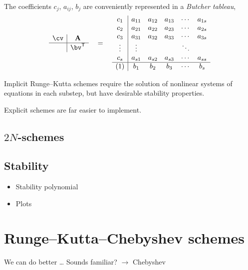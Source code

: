 \documentclass[\mydriver,12pt,twoside,notitlepage]{article}
\newcommand{\Av}      {\mathbf{A}}
\begin{document}
The coefficients $c_j$, $a_{ij}$, $b_j$ are conveniently represented in a
\emph{Butcher tableau},
\begin{equation}
  \begin{array}{c|c}
    \cv & \Av \\
    \hline
        & \bv^{\mathsf T}
  \end{array}
  \quad=\quad
  \begin{array}{c|ccccc}
    c_1    & a_{11} & a_{12} & a_{13} & \cdots & a_{1s} \\
    c_2    & a_{21} & a_{22} & a_{23} & \cdots & a_{2s} \\
    c_3    & a_{31} & a_{32} & a_{33} & \cdots & a_{3s} \\
    \vdots & \vdots &        &        & \ddots &        \\
    c_s    & a_{s1} & a_{s2} & a_{s3} & \cdots & a_{ss} \\
    \hline
    (1)    & b_1    & b_2    & b_3    & \cdots & b_s
  \end{array}
\end{equation}

Implicit Runge--Kutta schemes require the solution of nonlinear systems of
equations in each substep, but have desirable stability properties.

Explicit schemes are far easier to implement.



\subsection{$2N$-schemes}

\subsection{Stability}

\begin{itemize}
  \item Stability polynomial
  \item Plots
\end{itemize}


\section{Runge--Kutta--Chebyshev schemes}

We can do better \ldots{}
Sounds familiar? $\rightarrow$ Chebyshev
\end{document}
